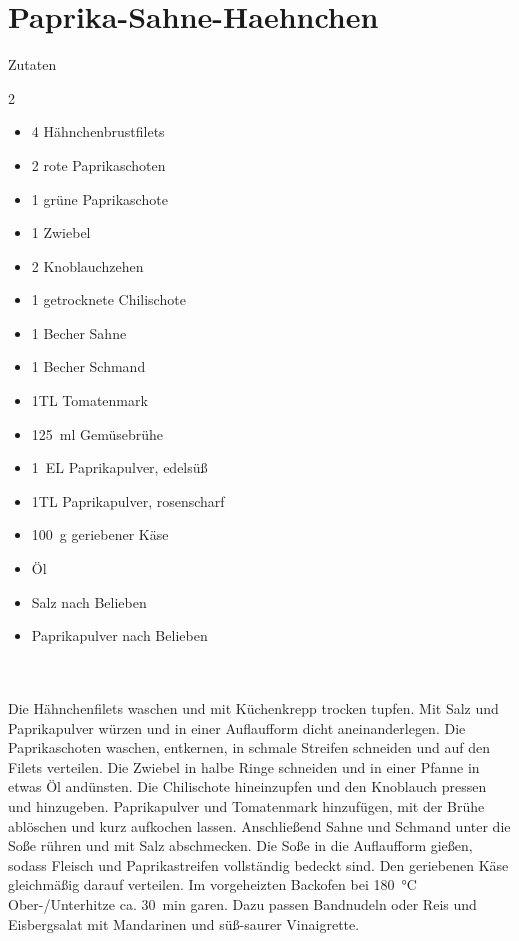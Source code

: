 \section*{Paprika-Sahne-Haehnchen}
\ihead{}\ohead{}
\cfoot{}
{\Large Zutaten}
\begin{multicols}{2}
\begin{itemize}
\item \num{4} Hähnchenbrustfilets
\item \num{2} rote Paprikaschoten
\item \num{1} grüne Paprikaschote
\item \num{1} Zwiebel
\item \num{2} Knoblauchzehen
\item \num{1} getrocknete Chilischote
\item \num{1} Becher Sahne
\item \num{1} Becher Schmand
\item \num{1}{TL} Tomatenmark
\item \SI{125}{ml} Gemüsebrühe
\item \SI{1}{EL} Paprikapulver, edelsüß
\item \num{1}{TL} Paprikapulver, rosenscharf
\item \SI{100}{g} geriebener Käse
\item Öl
\item Salz nach Belieben
\item Paprikapulver nach Belieben
\end{itemize}
\end{multicols}
\\
\\
Die Hähnchenfilets waschen und mit Küchenkrepp trocken tupfen.
Mit Salz und Paprikapulver würzen und in einer Auflaufform dicht aneinanderlegen.
Die Paprikaschoten waschen, entkernen, in schmale Streifen schneiden und auf den Filets verteilen.
Die Zwiebel in halbe Ringe schneiden und in einer Pfanne in etwas Öl andünsten.
Die Chilischote hineinzupfen und den Knoblauch pressen und hinzugeben.
Paprikapulver und Tomatenmark hinzufügen, mit der Brühe ablöschen und kurz aufkochen lassen.
Anschließend Sahne und Schmand unter die Soße rühren und mit Salz abschmecken.
Die Soße in die Auflaufform gießen, sodass Fleisch und Paprikastreifen vollständig bedeckt sind.
Den geriebenen Käse gleichmäßig darauf verteilen.
Im vorgeheizten Backofen bei \SI{180}{\celsius} Ober-/Unterhitze ca. \SI{30}{min} garen.
Dazu passen Bandnudeln oder Reis und Eisbergsalat mit Mandarinen und süß-saurer Vinaigrette.
